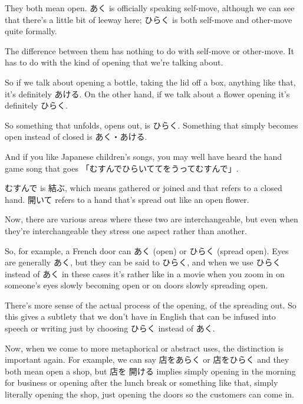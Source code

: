 They both mean open. あく is officially speaking self-move, although we can see that there's a little bit of leeway here; ひらく is both self-move and other-move quite formally.

The difference between them has nothing to do with self-move or other-move. It has to do with the kind of opening that we're talking about.

So if we talk about opening a bottle, taking the lid off a box, anything like that, it's definitely あける. On the other hand, if we talk about a flower opening it's definitely ひらく.

So something that unfolds, opens out, is ひらく. Something that simply becomes open instead of closed is あく・あける.

And if you like Japanese children's songs, you may well have heard the hand game song that goes 「むすんでひらいててをうってむすんで」.

{}

むすんで is 結ぶ, which means gathered or joined and that refers to a closed hand. 開いて refers to a hand that's spread out like an open flower.

Now, there are various areas where these two are interchangeable, but even when they're interchangeable they stress one aspect rather than another.

{}

So, for example, a French door can あく (open) or ひらく (spread open). Eyes are generally あく, but they can be said to ひらく, and when we use ひらく instead of あく in these cases it's rather like in a movie when you zoom in on someone's eyes slowly becoming open or on doors slowly spreading open.

There's more sense of the actual process of the opening, of the spreading out. So this gives a subtlety that we don't have in English that can be infused into speech or writing just by choosing ひらく instead of あく.

Now, when we come to more metaphorical or abstract uses, the distinction is important again. For example, we can say 店をあらく or 店をひらく and they both mean open a shop, but 店を 開ける implies simply opening in the morning for business or opening after the lunch break or something like that, simply literally opening the shop, just opening the doors so the customers can come in.

{}

